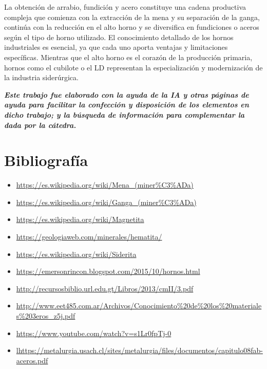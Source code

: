 \documentclass[12pt,a4paper]{article}
\begin{document}
La obtención de arrabio, fundición y acero constituye una cadena productiva compleja que comienza con la extracción de la mena y su separación de la ganga, continúa con la reducción en el alto horno y se diversifica en fundiciones o aceros según el tipo de horno utilizado. El conocimiento detallado de los hornos industriales es esencial, ya que cada uno aporta ventajas y limitaciones específicas. Mientras que el alto horno es el corazón de la producción primaria, hornos como el cubilote o el LD representan la especialización y modernización de la industria siderúrgica.

\vfill
\textit{\textbf{Este trabajo fue elaborado con la ayuda de la IA y otras páginas de ayuda para facilitar la confección y disposición de los elementos en dicho trabajo; y la búsqueda de información para complementar la dada por la cátedra.}}

\newpage
\section{Bibliografía}
\begin{itemize}
    \item \url{https://es.wikipedia.org/wiki/Mena_(miner%C3%ADa)}
    \item \url{https://es.wikipedia.org/wiki/Ganga_(miner%C3%ADa)}
    \item \url{https://es.wikipedia.org/wiki/Magnetita}
    \item \url{https://geologiaweb.com/minerales/hematita/}
    \item \url{https://es.wikipedia.org/wiki/Siderita}
    \item \url{https://emersonrincon.blogspot.com/2015/10/hornos.html}
    \item \url{http://recursosbiblio.url.edu.gt/Libros/2013/cmII/3.pdf}
    \item \url{http://www.eet485.com.ar/Archivos/Conocimiento%20de%20los%20materiales%203eros_z5j.pdf}
    \item \url{https://www.youtube.com/watch?v=s1Lr0fpTj-0}
    \item \url{lhttps://metalurgia.usach.cl/sites/metalurgia/files/documentos/capitulo08fab-aceros.pdf}
\end{itemize}
\end{document}
